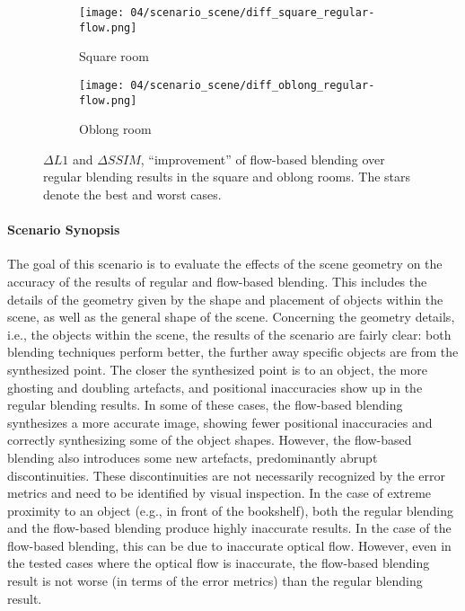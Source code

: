 \begin{figure}
\centering
    \hfill
    \begin{subfigure}[b]{0.45\textwidth}
            \centering
            \texttt{[image: 04/scenario\_scene/diff\_square\_regular-flow.png]}
            \caption{Square room}
    \end{subfigure}
    \hfill
    \begin{subfigure}[b]{0.45\textwidth}
            \centering
            \texttt{[image: 04/scenario\_scene/diff\_oblong\_regular-flow.png]}
            \caption{Oblong room}
    \end{subfigure}
    \hfill
  \caption[$\Delta L1$ and $\Delta SSIM$ in the square and oblong rooms]{$\Delta L1$ and $\Delta SSIM$, ``improvement'' of flow-based blending over regular blending results in the square and oblong rooms. The stars denote the best and worst cases.} \label{fig:scene_diff_square_oblong}
\end{figure}

\paragraph{Scenario Synopsis}
The goal of this scenario is to evaluate the effects of the scene geometry on the accuracy of the results of regular and flow-based blending. This includes the details of the geometry given by the shape and placement of objects within the scene, as well as the general shape of the scene.
Concerning the geometry details, i.e., the objects within the scene, the results of the scenario are fairly clear: both blending techniques perform better, the further away specific objects are from the synthesized point. The closer the synthesized point is to an object, the more ghosting and doubling artefacts, and positional inaccuracies show up in the regular blending results.
In some of these cases, the flow-based blending synthesizes a more accurate image, showing fewer positional inaccuracies and correctly synthesizing some of the object shapes. However, the flow-based blending also introduces some new artefacts, predominantly abrupt discontinuities. These discontinuities are not necessarily recognized by the error metrics and need to be identified by visual inspection. In the case of extreme proximity to an object (e.g., in front of the bookshelf), both the regular blending and the flow-based blending produce highly inaccurate results. In the case of the flow-based blending, this can be due to inaccurate optical flow. However, even in the tested cases where the optical flow is inaccurate, the flow-based blending result is not worse (in terms of the error metrics) than the regular blending result.


